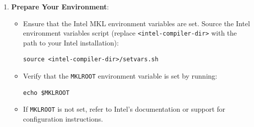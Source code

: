 \documentclass[a4paper,12pt]{article}
\begin{document}
\begin{enumerate}
    \item \textbf{Prepare Your Environment}:
          \begin{itemize}
              \item Ensure that the Intel MKL environment variables are set. Source the Intel
                    environment variables script (replace \texttt{<intel-compiler-dir>} with the
                    path to your Intel installation):
                    \begin{verbatim}
source <intel-compiler-dir>/setvars.sh
            \end{verbatim}
              \item Verify that the \texttt{MKLROOT} environment variable is set by running:
                    \begin{verbatim}
echo $MKLROOT
            \end{verbatim}
              \item If \texttt{MKLROOT} is not set, refer to Intel’s documentation or support for
                    configuration instructions.
          \end{itemize}


\end{enumerate}
\end{document}
